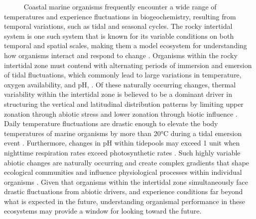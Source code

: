 \documentclass[
  12pt,
]{article}
\begin{document}
~~~~~ Coastal marine organisms frequently encounter a wide range of
temperatures and experience fluctuations in biogeochemistry, resulting
from temporal variations, such as tidal and seasonal cycles. The rocky
intertidal system is one such system that is known for its variable
conditions on both temporal and spatial scales, making them a model
ecosystem for understanding how organisms interact and respond to change
\cite{connell1961influence, paine1969pisaster, kwiatkowski2016nighttime, jellison2022low}.
Organisms within the rocky intertidal zone must contend with alternating
periods of immersion and emersion of tidal fluctuations, which commonly
lead to large variations in temperature, oxygen availability, and pH,
\cite{denny2001physical; helmuth2002climate}. Of these naturally
occurring changes, thermal variability within the intertidal zone is
believed to be a dominant driver in structuring the vertical and
latitudinal distribution patterns by limiting upper zonation through
abiotic stress and lower zonation through biotic influence
\cite{helmuth2006mosaic; somero2002thermal, somero2010physiology, connell1961influence}.
Daily temperature fluctuations are drastic enough to elevate the body
temperatures of marine organisms by more than 20°C during a tidal
emersion event \cite{Helmuth, 1999}. Furthermore, changes in pH within
tidepools may exceed 1 unit when nighttime respiration rates exceed
photosynthetic rates \cite{jellison2016ocean, kwiatkowski2016nighttime}.
Such highly variable abiotic changes are naturally occurring and create
complex gradients that shape ecological communities and influence
physiological processes within individual organisms
\cite{helmuth2006mosaic}. Given that organisms within the intertidal
zone simultaneously face drastic fluctuations from abiotic drivers, and
experience conditions far beyond what is expected in the future,
understanding organismal performance in these ecosystems may provide a
window for looking toward the future.
\end{document}
